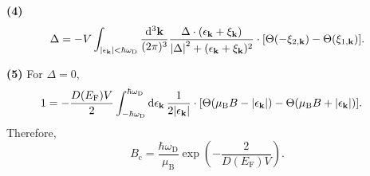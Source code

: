 \documentclass{article}
\makeatletter
\newcommand*{\shifttext}[1]{%
  \settowidth{\@tempdima}{#1}%
  \hspace{-\@tempdima}#1%
}
\newcommand{\plabel}[1]{%
\shifttext{\textbf{#1}\quad}%
}
\newcommand{\minusbaseline}{\abovedisplayskip=0pt\abovedisplayshortskip=0pt~\vspace*{-\baselineskip}}%
\makeatother
\begin{document}
\plabel{(4)}%
\begingroup\minusbaseline
\[ \Delta = -V \int_{\abs{\epsilon_{\vb{k}}} < \hbar\omega_{\mathrm{D}}} \frac{\dd[3]{\vb{k}}}{(2\pi)^3} \frac{\Delta \cdot (\epsilon_{\vb{k}} + \xi_{\vb{k}})}{\abs{\Delta}^2 + (\epsilon_{\vb{k}} + \xi_{\vb{k}})^2} \cdot \qty[\Theta(-\xi_{2,\vb{k}}) - \Theta(\xi_{1,\vb{k}})]. \]
\endgroup

\plabel{(5)}%
For $\Delta = 0$,
\begin{align*}
  1 &= -\frac{D(E_{\mathrm{F}}) V}{2} \int_{-\hbar\omega_{\mathrm{D}}}^{\hbar\omega_{\mathrm{D}}} \dd{\epsilon_{\vb{k}}} \frac{1}{2\abs{\epsilon_{\vb{k}}}} \cdot \qty[\Theta(\mu_{\mathrm{B}}B - \abs{\epsilon_{\vb{k}}}) - \Theta(\mu_{\mathrm{B}}B + \abs{\epsilon_{\vb{k}}})].
\end{align*}
Therefore,
\[ B_{\mathrm{c}} = \frac{\hbar \omega_{\mathrm{D}}}{\mu_{\mathrm{B}}} \exp(-\frac{2}{D(E_{\mathrm{F}})V}). \]

% 
% 
\end{document}
